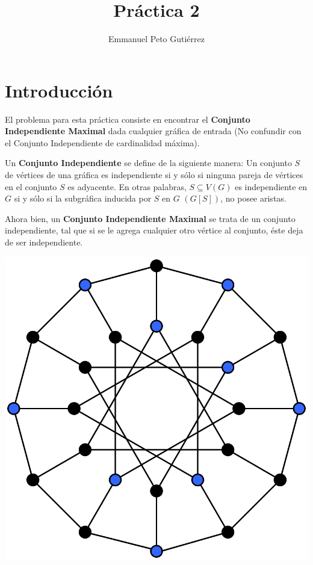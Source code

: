 \documentclass{article}
\title{Práctica 2}
\author{Emmanuel Peto Gutiérrez}
\begin{document}
\maketitle

\section{Introducción}

El problema para esta práctica consiste en encontrar el \textbf{Conjunto Independiente Maximal} dada cualquier gráfica de entrada (No confundir con el Conjunto Independiente de cardinalidad máxima).

Un \textbf{Conjunto Independiente} se define de la siguiente manera: Un conjunto $S$ de vértices de una gráfica es independiente si y sólo si ninguna pareja de vértices en el conjunto $S$ es adyacente. En otras palabras, $S \subseteq V (G)$ es independiente en $G$ si y sólo si la subgráfica inducida por $S$ en $G$ $(G[S])$, no posee aristas.

Ahora bien, un \textbf{Conjunto Independiente Maximal} se trata de un conjunto independiente, tal que si se le agrega cualquier otro vértice al conjunto, éste deja de ser independiente.

\begin{center}
\includegraphics[scale=0.2]{graf1}
\end{center}
\end{document}
